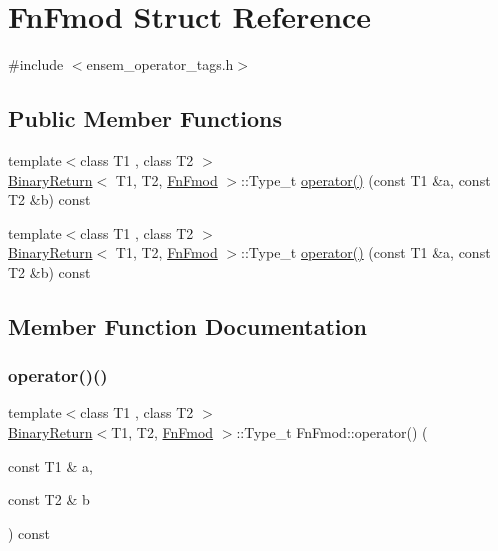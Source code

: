 \hypertarget{structFnFmod}{}\section{Fn\+Fmod Struct Reference}
\label{structFnFmod}


{\ttfamily \#include $<$ensem\+\_\+operator\+\_\+tags.\+h$>$}

\subsection*{Public Member Functions}
\begin{DoxyCompactItemize}
\item 
{\footnotesize template$<$class T1 , class T2 $>$ }\\\mbox{\hyperlink{structBinaryReturn}{Binary\+Return}}$<$ T1, T2, \mbox{\hyperlink{structFnFmod}{Fn\+Fmod}} $>$\+::Type\+\_\+t \mbox{\hyperlink{structFnFmod_a9eb37a001ef170a6ad8ce1fcc2feec5e}{operator()}} (const T1 \&a, const T2 \&b) const
\item 
{\footnotesize template$<$class T1 , class T2 $>$ }\\\mbox{\hyperlink{structBinaryReturn}{Binary\+Return}}$<$ T1, T2, \mbox{\hyperlink{structFnFmod}{Fn\+Fmod}} $>$\+::Type\+\_\+t \mbox{\hyperlink{structFnFmod_a9eb37a001ef170a6ad8ce1fcc2feec5e}{operator()}} (const T1 \&a, const T2 \&b) const
\end{DoxyCompactItemize}


\subsection{Member Function Documentation}
\mbox{\label{structFnFmod_a9eb37a001ef170a6ad8ce1fcc2feec5e}} 
\subsubsection{\texorpdfstring{operator()()}{operator()()}\hspace{0.1cm}{\footnotesize\ttfamily [1/2]}}
{\footnotesize\ttfamily template$<$class T1 , class T2 $>$ \\
\mbox{\hyperlink{structBinaryReturn}{Binary\+Return}}$<$T1, T2, \mbox{\hyperlink{structFnFmod}{Fn\+Fmod}} $>$\+::Type\+\_\+t Fn\+Fmod\+::operator() (\begin{DoxyParamCaption}\item[{const T1 \&}]{a,  }\item[{const T2 \&}]{b }\end{DoxyParamCaption}) const\hspace{0.3cm}{\ttfamily [inline]}}

